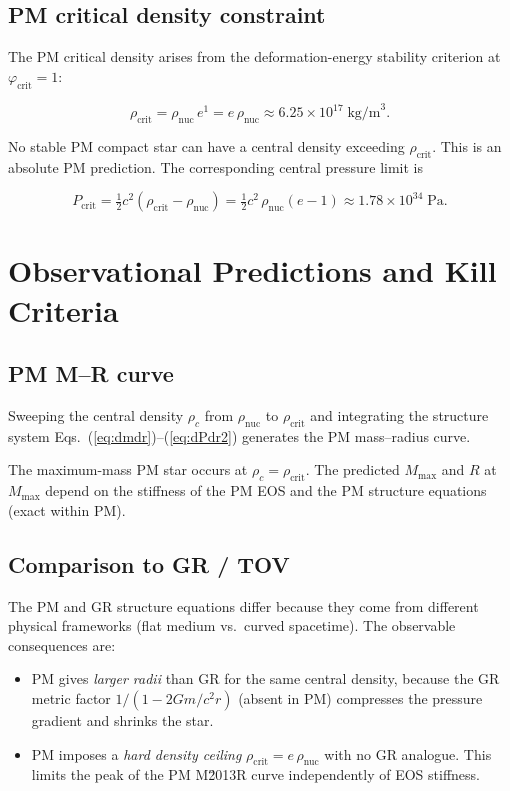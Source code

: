 \documentclass[11pt,a4paper]{article}
\newcommand{\rhonuc}{\rho_\text{nuc}}
\newcommand{\rhocrit}{\rho_\text{crit}}
\newcommand{\pcrit}{P_\text{crit}}
\newcommand{\half}{\tfrac{1}{2}}
\begin{document}
\subsection{PM critical density constraint}

The PM critical density arises from the deformation-energy stability criterion
at $\varphi_\text{crit} = 1$:

\begin{equation}
  \rhocrit = \rhonuc\,e^1 = e\,\rhonuc \approx 6.25\times10^{17}\;\text{kg/m}^3.
  \label{eq:rho_crit}
\end{equation}

No stable PM compact star can have a central density exceeding $\rhocrit$.
This is an absolute PM prediction.  The corresponding central pressure limit is

\begin{equation}
  \pcrit = \half c^2(\rhocrit - \rhonuc) = \half c^2\,\rhonuc(e-1)
         \approx 1.78\times10^{34}\;\text{Pa}.
\end{equation}

\section{Observational Predictions and Kill Criteria}

\subsection{PM M–R curve}

Sweeping the central density $\rho_c$ from $\rhonuc$ to $\rhocrit$ and
integrating the structure system Eqs.~(\ref{eq:dmdr})--(\ref{eq:dPdr2})
generates the PM mass–radius curve.

The maximum-mass PM star occurs at $\rho_c = \rhocrit$.  The predicted
$M_\text{max}$ and $R$ at $M_\text{max}$ depend on the stiffness of the PM EOS
and the PM structure equations (exact within PM).

\subsection{Comparison to GR / TOV}

The PM and GR structure equations differ because they come from different
physical frameworks (flat medium vs.\ curved spacetime).  The observable
consequences are:
\begin{itemize}
  \item PM gives \emph{larger radii} than GR for the same central density,
    because the GR metric factor $1/(1-2Gm/c^2r)$ (absent in PM) compresses
    the pressure gradient and shrinks the star.
  \item PM imposes a \emph{hard density ceiling} $\rhocrit = e\,\rhonuc$ with
    no GR analogue.  This limits the peak of the PM M\u2013R curve independently
    of EOS stiffness.
\end{itemize}
\end{document}
